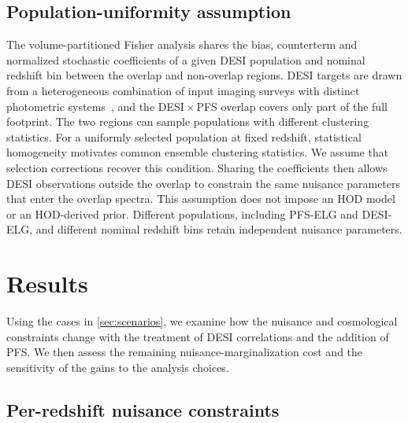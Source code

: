 \documentclass[a4paper,11pt]{article}
\newcommand{\revchange}[1]{{\color{RevisionColor}#1}}
\begin{document}
\subsection{\texorpdfstring{\revchange{Population-uniformity assumption}}{Population-uniformity assumption}}
\label{sec:hod_uniformity}

\revchange{The volume-partitioned Fisher analysis shares the bias, counterterm
and normalized stochastic coefficients of a given DESI
population and nominal redshift bin between the overlap and
non-overlap regions.}
DESI targets are drawn from a
heterogeneous combination of input imaging
surveys with distinct photometric
systems~\cite{DESI:2022gle,Raichoor:2022jab,Chaussidon:2022pqg},
\revchange{and the DESI\,$\times$\,PFS} overlap covers only part of the full footprint\revchange{.
The two regions can sample populations with different clustering statistics. For a uniformly selected population at fixed
redshift, statistical homogeneity motivates common ensemble clustering
statistics. We assume that selection corrections recover this condition.
Sharing the coefficients then allows DESI observations outside the overlap to
constrain the same nuisance parameters that enter the overlap spectra.
This assumption does not impose an HOD model or an HOD-derived prior.
Different populations, including PFS-ELG and DESI-ELG, and
different nominal redshift bins retain independent
nuisance parameters.}


\section{Results}
\label{sec:results}

\revchange{Using the cases in \cref{sec:scenarios}, we examine how
the nuisance and cosmological constraints change with the treatment
of DESI correlations and the addition of PFS. We then assess the
remaining nuisance-marginalization cost and the sensitivity of the
gains to the analysis choices.}

\subsection{Per-redshift nuisance constraints}
\label{sec:results_priors}
\end{document}
